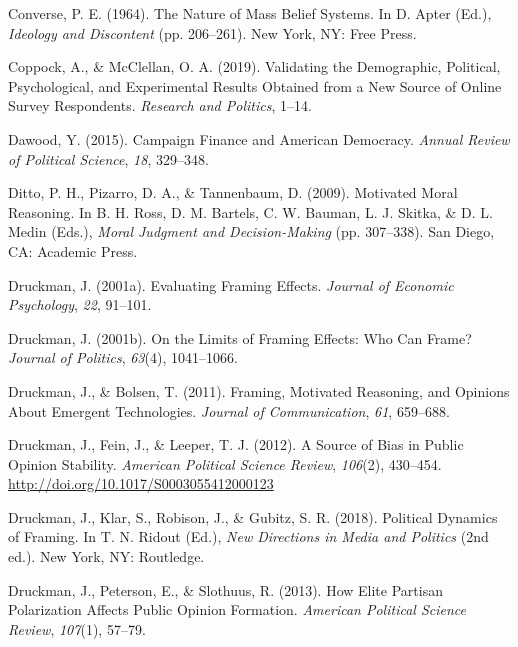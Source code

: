 \documentclass[12pt,econ]{sources/authesis}
\begin{document}
\leavevmode\hypertarget{ref-converse_nature_1964}{}%
Converse, P. E. (1964). The Nature of Mass Belief Systems. In D. Apter (Ed.), \emph{Ideology and Discontent} (pp. 206--261). New York, NY: Free Press.

\leavevmode\hypertarget{ref-coppock_2019_validating}{}%
Coppock, A., \& McClellan, O. A. (2019). Validating the Demographic, Political, Psychological, and Experimental Results Obtained from a New Source of Online Survey Respondents. \emph{Research and Politics}, 1--14.

\leavevmode\hypertarget{ref-dawood_campaign_2015}{}%
Dawood, Y. (2015). Campaign Finance and American Democracy. \emph{Annual Review of Political Science}, \emph{18}, 329--348.

\leavevmode\hypertarget{ref-ditto_motivated_2009}{}%
Ditto, P. H., Pizarro, D. A., \& Tannenbaum, D. (2009). Motivated Moral Reasoning. In B. H. Ross, D. M. Bartels, C. W. Bauman, L. J. Skitka, \& D. L. Medin (Eds.), \emph{Moral Judgment and Decision-Making} (pp. 307--338). San Diego, CA: Academic Press.

\leavevmode\hypertarget{ref-druckman_evaluating_2001}{}%
Druckman, J. (2001a). Evaluating Framing Effects. \emph{Journal of Economic Psychology}, \emph{22}, 91--101.

\leavevmode\hypertarget{ref-druckman_limits_2001}{}%
Druckman, J. (2001b). On the Limits of Framing Effects: Who Can Frame? \emph{Journal of Politics}, \emph{63}(4), 1041--1066.

\leavevmode\hypertarget{ref-druckman_framing_2011}{}%
Druckman, J., \& Bolsen, T. (2011). Framing, Motivated Reasoning, and Opinions About Emergent Technologies. \emph{Journal of Communication}, \emph{61}, 659--688.

\leavevmode\hypertarget{ref-druckman_source_2012}{}%
Druckman, J., Fein, J., \& Leeper, T. J. (2012). A Source of Bias in Public Opinion Stability. \emph{American Political Science Review}, \emph{106}(2), 430--454. \url{http://doi.org/10.1017/S0003055412000123}

\leavevmode\hypertarget{ref-druckman_political_2018}{}%
Druckman, J., Klar, S., Robison, J., \& Gubitz, S. R. (2018). Political Dynamics of Framing. In T. N. Ridout (Ed.), \emph{New Directions in Media and Politics} (2nd ed.). New York, NY: Routledge.

\leavevmode\hypertarget{ref-druckman_how_2013}{}%
Druckman, J., Peterson, E., \& Slothuus, R. (2013). How Elite Partisan Polarization Affects Public Opinion Formation. \emph{American Political Science Review}, \emph{107}(1), 57--79.
\end{document}
